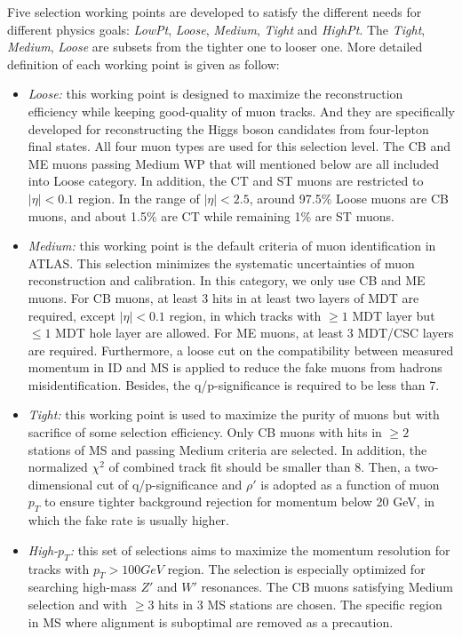 Five selection working points are developed to satisfy the different needs for different physics goals: \textit{LowPt}, \textit{Loose}, \textit{Medium}, \textit{Tight} and \textit{HighPt}.
The \textit{Tight}, \textit{Medium}, \textit{Loose} are subsets from the tighter one to looser one.
More detailed definition of each working point is given as follow:
\begin{itemize}
	\item \textit{Loose:} this working point is designed to maximize the reconstruction efficiency while keeping good-quality of muon tracks. And they are specifically developed for reconstructing the Higgs boson candidates from four-lepton final states. All four muon types are used for this selection level. The CB and ME muons passing Medium WP that will mentioned below are all included into Loose category. In addition, the CT and ST muons are restricted to $|\eta| < 0.1$ region.
In the range of $|\eta| < 2.5$, around 97.5\% Loose muons are CB muons, and about 1.5\% are CT while remaining 1\% are ST muons.
	\item \textit{Medium:} this working point is the default criteria of muon identification in ATLAS. This selection minimizes the systematic uncertainties of muon reconstruction and calibration. In this category, we only use CB and ME muons. For CB muons, at least 3 hits in at least two layers of MDT are required, except $|\eta| < 0.1$ region, in which tracks with $\geq 1$ MDT layer but $\leq 1$ MDT hole layer are allowed. For ME muons, at least 3 MDT/CSC layers are required.
Furthermore, a loose cut on the compatibility between measured momentum in ID and MS is applied to reduce the fake muons from hadrons misidentification. Besides, the q/p-significance is required to be less than 7.
	\item \textit{Tight:} this working point is used to maximize the purity of muons but with sacrifice of some selection efficiency. Only CB muons with hits in $\geq 2$ stations of MS and passing Medium criteria are selected.
In addition, the normalized $\chi^{2}$ of combined track fit should be smaller than 8. Then, a two-dimensional cut of q/p-significance and $\rho'$ is adopted as a function of muon $p_{T}$ to ensure tighter background rejection for momentum below 20 GeV, in which the fake rate is usually higher.
	\item \textit{High-$p_{T}$:} this set of selections aims to maximize the momentum resolution for tracks with $p_{T} > 100 GeV$ region. The selection is especially optimized for searching high-mass $Z'$ and $W'$ resonances. The CB muons satisfying Medium selection and with $\geq 3$ hits in 3 MS stations are chosen. The specific region in MS where alignment is suboptimal are removed as a precaution.

\end{itemize}
